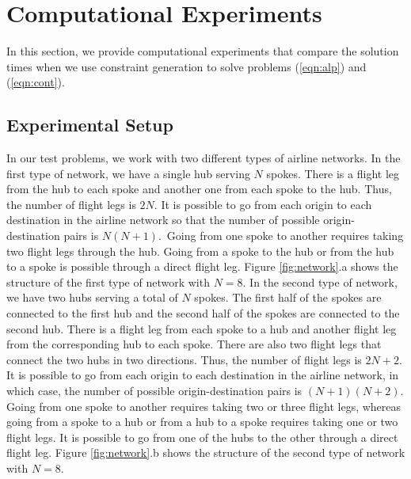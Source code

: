 \section{Computational Experiments}
\label{sec:exp}


In this section, we provide computational experiments that compare the solution times when we use constraint generation to solve problems (\ref{eqn:alp}) and (\ref{eqn:cont}).


\subsection{Experimental Setup}

In our test problems, we work with two different types of airline networks. In the first type of network, we have a single hub serving $N$ spokes. There is a flight leg from the hub to each spoke and another one from each spoke to the hub. Thus, the number of flight legs is $2N$. It is possible to go from each origin to each destination in the airline network so that the number of possible origin-destination pairs is $N (N+1)$.~Going from one spoke to another  requires taking two flight legs through the hub. Going from a spoke to the hub or from the hub to a spoke is possible through a direct flight leg. Figure \ref{fig:network}.a shows the structure of the first type of network with  $N = 8$. In the second type of network, we have two hubs serving a total of $N$ spokes. The first half of the spokes are connected to the first hub and the second half of the spokes are connected to the second hub. There is a flight leg from each spoke to a hub and another flight leg from the corresponding hub to each spoke. There are also two flight legs that connect the two hubs in two directions. Thus, the number of flight legs is $2N + 2$. It is possible to go from each origin to each destination in the airline network, in which case, the number of possible origin-destination pairs is $(N+1)(N+2)$. Going from one spoke to another requires taking two or three flight legs,  whereas going from a spoke to a hub or from a hub to a spoke requires taking one or two flight legs. It is possible to go from one of the hubs to the other through a direct flight leg. Figure \ref{fig:network}.b shows the structure of the second type of network with $N=8$.

